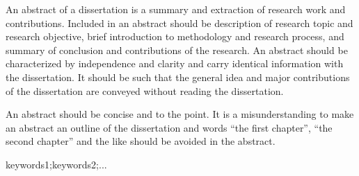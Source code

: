 \textbf{}
An abstract of a dissertation is a summary and extraction of research work and contributions.
Included in an abstract should be description of research topic and research objective, brief introduction to methodology and research process, and summary of conclusion and contributions of the research.
An abstract should be characterized by independence and clarity and carry identical information with the dissertation.
It should be such that the general idea and major contributions of the dissertation are conveyed without reading the dissertation.
\par
An abstract should be concise and to the point.
It is a misunderstanding to make an abstract an outline of the dissertation and words “the first chapter”, “the second chapter” and the like should be avoided in the abstract.
\par

\vspace{1em}
\textbf{}
keywords1;keywords2;...
\fi
